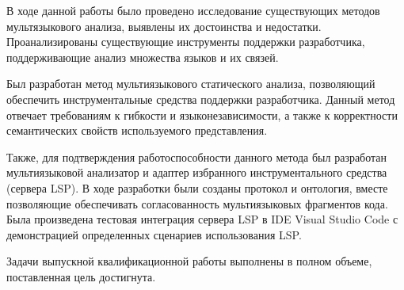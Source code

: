 \Conclusion %

В ходе данной работы было проведено исследование существующих методов мультязыкового анализа,
выявлены их достоинства и недостатки. Проанализированы существующие инструменты поддержки разработчика,
поддерживающие анализ множества языков и их связей.

Был разработан метод мультиязыкового статического анализа, позволяющий
обеспечить инструментальные средства поддержки разработчика. Данный метод отвечает требованиям
к гибкости и языконезависимости, а также к корректности семантических свойств используемого представления.

Также, для подтверждения работоспособности данного метода был разработан мультиязыковой анализатор
и адаптер избранного инструментального средства (сервера LSP). В ходе разработки были созданы
протокол и онтология, вместе позволяющие обеспечивать согласованность мультиязыковых фрагментов
кода. Была произведена тестовая интеграция сервера LSP в IDE Visual Studio Code с демонстрацией определенных
сценариев использования LSP.

Задачи выпускной квалификационной работы выполнены в полном объеме, поставленная цель достигнута.

